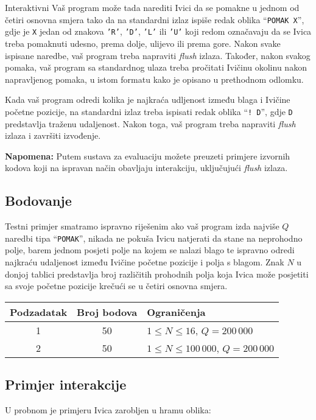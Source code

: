 \begin{statement}[
  problempoints=100,
  timelimit=1 sekunda,
  memorylimit=512 MiB,
]{Interaktivni}
Vaš program može tada narediti Ivici da se pomakne u jednom od četiri osnovna
smjera tako da na standardni izlaz ispiše redak oblika ``\texttt{POMAK X}'',
gdje je \texttt{X} jedan od znakova \texttt{'R'}, \texttt{'D'}, \texttt{'L'}
ili \texttt{'U'} koji redom označavaju da se Ivica treba pomaknuti udesno,
prema dolje, ulijevo ili prema gore. Nakon svake ispisane naredbe, vaš
program treba napraviti \textit{flush} izlaza. Također, nakon svakog pomaka,
vaš program sa standardnog ulaza treba pročitati Ivičinu okolinu nakon
napravljenog pomaka, u istom formatu kako je opisano u prethodnom odlomku.

Kada vaš program odredi kolika je najkraća udljenost između blaga i Ivičine
početne pozicije, na standardni izlaz treba ispisati redak oblika
``\texttt{\frenchspacing! D}'', gdje \texttt{D} predstavlja traženu
udaljenost. Nakon toga, vaš program treba napraviti \textit{flush} izlaza i
završiti izvođenje.

\textbf{Napomena:} Putem sustava za evaluaciju možete preuzeti primjere
izvornih kodova koji na ispravan način obavljaju interakciju, uključujući
\textit{flush} izlaza.

\subsection*{Bodovanje}
Testni primjer smatramo ispravno riješenim ako vaš program izda najviše $Q$
naredbi tipa ``\texttt{POMAK}'', nikada ne pokuša Ivicu natjerati da stane na
neprohodno polje, barem jednom posjeti polje na kojem se nalazi blago te
ispravno odredi najkraću udaljenost između Ivičine početne pozicije i polja s
blagom. Znak $N$ u donjoj tablici predstavlja broj različitih prohodnih polja
koja Ivica može posjetiti sa svoje početne pozicije krečući se u četiri osnovna
smjera.

{\renewcommand{\arraystretch}{1.4}
  \setlength{\tabcolsep}{6pt}
  \begin{tabular}{ccl}
 Podzadatak & Broj bodova & Ograničenja \\ \midrule
  1 & 50 & $1 \le N \le 16$, $Q = 200\,000$\\
  2 & 50 & $1 \le N \le 100\,000$, $Q = 200\,000$\\
\end{tabular}}

\subsection*{Primjer interakcije}
U probnom je primjeru Ivica zarobljen u hramu oblika:


\end{statement}
